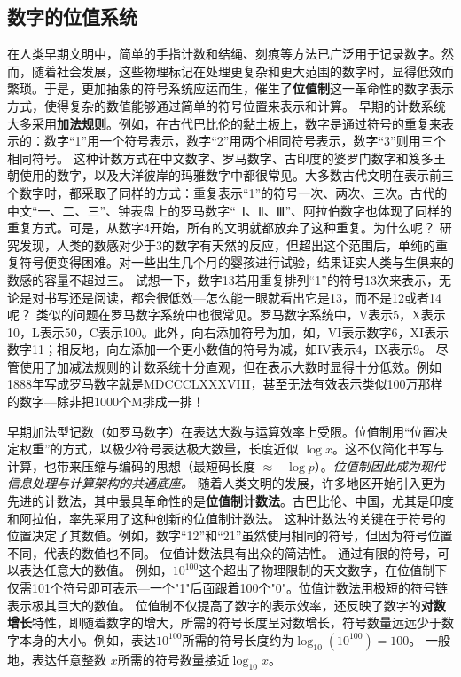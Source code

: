 \subsection{数字的位值系统}

在人类早期文明中，简单的手指计数和结绳、刻痕等方法已广泛用于记录数字。然而，随着社会发展，这些物理标记在处理更复杂和更大范围的数字时，显得低效而繁琐。于是，更加抽象的符号系统应运而生，催生了{\bf 位值制}这一革命性的数字表示方式，使得复杂的数值能够通过简单的符号位置来表示和计算。
早期的计数系统大多采用{\bf 加法规则}。例如，在古代巴比伦的黏土板上，数字是通过符号的重复来表示的：数字“1”用一个符号表示，数字“2”用两个相同符号表示，数字“3”则用三个相同符号。
这种计数方式在中文数字、罗马数字、古印度的婆罗门数字和笈多王朝使用的数字，以及大洋彼岸的玛雅数字中都很常见。大多数古代文明在表示前三个数字时，都采取了同样的方式：重复表示“1”的符号一次、两次、三次。古代的中文“一、二、三”、钟表盘上的罗马数字“~Ⅰ、Ⅱ、Ⅲ”、阿拉伯数字也体现了同样的重复方式。可是，从数字4开始，所有的文明就都放弃了这种重复。为什么呢？
研究发现，人类的数感对少于3的数字有天然的反应，但超出这个范围后，单纯的重复符号便变得困难。对一些出生几个月的婴孩进行试验，结果证实人类与生俱来的数感的容量不超过三。
试想一下，数字13若用重复排列“1”的符号13次来表示，无论是对书写还是阅读，都会很低效---怎么能一眼就看出它是13，而不是12或者14呢？
类似的问题在罗马数字系统中也很常见。罗马数字系统中，V表示5，X表示10，L表示50，C表示100。此外，向右添加符号为加，如，VI表示数字6，XI表示数字11；相反地，向左添加一个更小数值的符号为减，如IV表示4，IX表示9。
尽管使用了加减法规则的计数系统十分直观，但在表示大数时显得十分低效。例如1888年写成罗马数字就是MDCCCLXXXVIII，甚至无法有效表示类似100万那样的数字---除非把1000个M排成一排！

早期加法型记数（如罗马数字）在表达大数与运算效率上受限。位值制用“位置决定权重”的方式，以极少符号表达极大数量，长度近似 $\log x$。这不仅简化书写与计算，也带来压缩与编码的思想（最短码长度 $\approx-\log p$）。\emph{位值制因此成为现代信息处理与计算架构的共通底座。}
随着人类文明的发展，许多地区开始引入更为先进的计数法，其中最具革命性的是{\bf 位值制计数法}。古巴比伦、中国，尤其是印度和阿拉伯，率先采用了这种创新的位值制计数法。
这种计数法的关键在于符号的位置决定了其数值。例如，数字“12”和“21”虽然使用相同的符号，但因为符号位置不同，代表的数值也不同。
位值计数法具有出众的简洁性。
通过有限的符号，可以表达任意大的数值。
例如，$10^{100}$这个超出了物理限制的天文数字，在位值制下仅需101个符号即可表示---一个"1"后面跟着100个"0"。位值计数法用极短的符号链表示极其巨大的数值。
位值制不仅提高了数字的表示效率，还反映了数字的{\bf 对数增长}特性，即随着数字的增大，所需的符号长度呈对数增长，符号数量远远少于数字本身的大小。例如，表达$10^{100}$所需的符号长度约为$\log_{10}(10^{100})=100$。
一般地，表达任意整数 $x$所需的符号数量接近${\log_{10} x}$。

